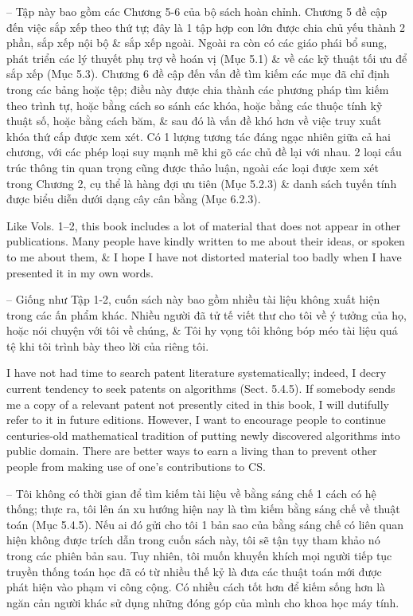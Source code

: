 \documentclass{article}
\begin{document}
\begin{itemize}
    -- Tập này bao gồm các Chương 5-6 của bộ sách hoàn chỉnh. Chương 5 đề cập đến việc sắp xếp theo thứ tự; đây là 1 tập hợp con lớn được chia chủ yếu thành 2 phần, sắp xếp nội bộ \& sắp xếp ngoài. Ngoài ra còn có các giáo phái bổ sung, phát triển các lý thuyết phụ trợ về hoán vị (Mục 5.1) \& về các kỹ thuật tối ưu để sắp xếp (Mục 5.3). Chương 6 đề cập đến vấn đề tìm kiếm các mục đã chỉ định trong các bảng hoặc tệp; điều này được chia thành các phương pháp tìm kiếm theo trình tự, hoặc bằng cách so sánh các khóa, hoặc bằng các thuộc tính kỹ thuật số, hoặc bằng cách băm, \& sau đó là vấn đề khó hơn về việc truy xuất khóa thứ cấp được xem xét. Có 1 lượng tương tác đáng ngạc nhiên giữa cả hai chương, với các phép loại suy mạnh mẽ khi gõ các chủ đề lại với nhau. 2 loại cấu trúc thông tin quan trọng cũng được thảo luận, ngoài các loại được xem xét trong Chương 2, cụ thể là hàng đợi ưu tiên (Mục 5.2.3) \& danh sách tuyến tính được biểu diễn dưới dạng cây cân bằng (Mục 6.2.3).
    
    Like Vols. 1--2, this book includes a lot of material that does not appear in other publications. Many people have kindly written to me about their ideas, or spoken to me about them, \& I hope I have not distorted material too badly when I have presented it in my own words.
    
    -- Giống như Tập 1-2, cuốn sách này bao gồm nhiều tài liệu không xuất hiện trong các ấn phẩm khác. Nhiều người đã tử tế viết thư cho tôi về ý tưởng của họ, hoặc nói chuyện với tôi về chúng, \& Tôi hy vọng tôi không bóp méo tài liệu quá tệ khi tôi trình bày theo lời của riêng tôi.
    
    I have not had time to search patent literature systematically; indeed, I decry current tendency to seek patents on algorithms (Sect. 5.4.5). If somebody sends me a copy of a relevant patent not presently cited in this book, I will dutifully refer to it in future editions. However, I want to encourage people to continue centuries-old mathematical tradition of putting newly discovered algorithms into public domain. There are better ways to earn a living than to prevent other people from making use of one's contributions to CS.
    
    -- Tôi không có thời gian để tìm kiếm tài liệu về bằng sáng chế 1 cách có hệ thống; thực ra, tôi lên án xu hướng hiện nay là tìm kiếm bằng sáng chế về thuật toán (Mục 5.4.5). Nếu ai đó gửi cho tôi 1 bản sao của bằng sáng chế có liên quan hiện không được trích dẫn trong cuốn sách này, tôi sẽ tận tụy tham khảo nó trong các phiên bản sau. Tuy nhiên, tôi muốn khuyến khích mọi người tiếp tục truyền thống toán học đã có từ nhiều thế kỷ là đưa các thuật toán mới được phát hiện vào phạm vi công cộng. Có nhiều cách tốt hơn để kiếm sống hơn là ngăn cản người khác sử dụng những đóng góp của mình cho khoa học máy tính.
    

\end{itemize}
\end{document}
